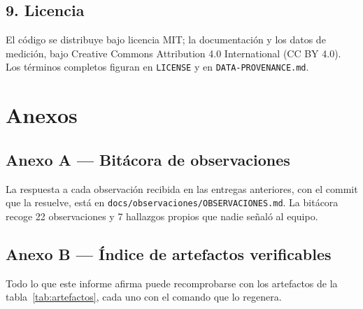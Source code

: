 \documentclass[11pt,a4paper]{article}
\begin{document}
\subsection*{9. Licencia}
El código se distribuye bajo licencia MIT; la documentación y los datos de
medición, bajo Creative Commons Attribution 4.0 International (CC BY 4.0). Los
términos completos figuran en \texttt{LICENSE} y en
\texttt{DATA-PROVENANCE.md}.

\appendix
\section{Anexos}\label{sec:anexos}

\subsection{Anexo A --- Bitácora de observaciones}

La respuesta a cada observación recibida en las entregas anteriores, con el
commit que la resuelve, está en \texttt{docs\-/observaciones\-/OBSERVACIONES.md}.
La bitácora recoge 22 observaciones y 7 hallazgos propios que nadie señaló al
equipo.

\subsection{Anexo B --- Índice de artefactos verificables}

Todo lo que este informe afirma puede recomprobarse con los artefactos de la
tabla~\ref{tab:artefactos}, cada uno con el comando que lo regenera.
\end{document}
